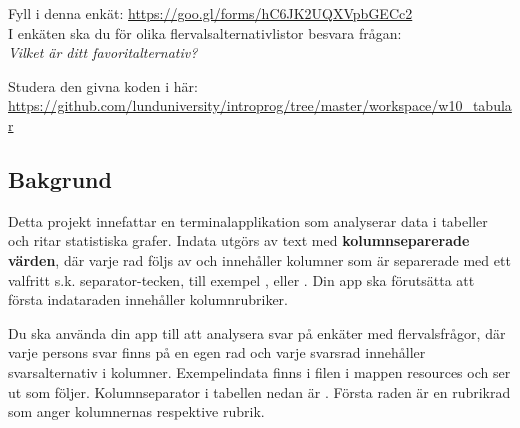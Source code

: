 


\begin{Preparations}
\item Fyll i denna enkät: \url{https://goo.gl/forms/hC6JK2UQXVpbGECc2}  \\
I enkäten ska du för olika flervalsalternativlistor besvara frågan: \\ \textit{Vilket är ditt favoritalternativ?}
\item Studera den givna koden i  här: \url{https://github.com/lunduniversity/introprog/tree/master/workspace/w10_tabular}
\end{Preparations}


\subsection{Bakgrund}

Detta projekt innefattar en terminalapplikation som analyserar data i tabeller och ritar statistiska grafer. Indata utgörs av text med \textbf{kolumnseparerade värden}, där varje rad följs av  och innehåller kolumner som är separerade med ett valfritt s.k. separator-tecken, till exempel ,  eller . Din app ska förutsätta att första indataraden innehåller kolumnrubriker.

Du ska använda din app till att analysera svar på enkäter med flervalsfrågor, där varje persons svar finns på en egen rad och varje svarsrad innehåller svarsalternativ i kolumner.
Exempelindata finns i filen  i mappen resources och ser ut som följer. Kolumnseparator i tabellen nedan är . Första raden är en rubrikrad som anger kolumnernas respektive rubrik.


